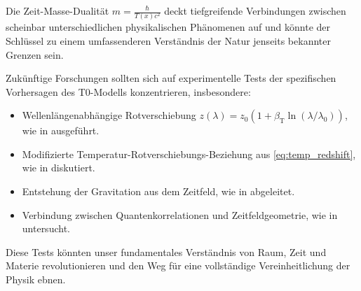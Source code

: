 \documentclass[12pt,a4paper]{article}
\newcommand{\Tfield}{T(x)}
\newcommand{\betaT}{\beta_{\text{T}}}
\begin{document}
	Die Zeit-Masse-Dualität \(m = \frac{\hbar}{\Tfield c^2}\) deckt tiefgreifende Verbindungen zwischen scheinbar unterschiedlichen physikalischen Phänomenen auf und könnte der Schlüssel zu einem umfassenderen Verständnis der Natur jenseits bekannter Grenzen sein.
	
	Zukünftige Forschungen sollten sich auf experimentelle Tests der spezifischen Vorhersagen des T0-Modells konzentrieren, insbesondere:
	
	\begin{itemize}
		\item Wellenlängenabhängige Rotverschiebung \(z(\lambda) = z_0 (1 + \betaT \ln(\lambda/\lambda_0))\), wie in \cite{pascher_messdifferenzen_2025} ausgeführt.
		\item Modifizierte Temperatur-Rotverschiebungs-Beziehung aus \cref{eq:temp_redshift}, wie in \cite{pascher_temp_2025} diskutiert.
		\item Entstehung der Gravitation aus dem Zeitfeld, wie in \cite{pascher_emergente_gravitation_2025} abgeleitet.
		\item Verbindung zwischen Quantenkorrelationen und Zeitfeldgeometrie, wie in \cite{pascher_feldtheorie_2025} untersucht.
	\end{itemize}
	
	Diese Tests könnten unser fundamentales Verständnis von Raum, Zeit und Materie revolutionieren und den Weg für eine vollständige Vereinheitlichung der Physik ebnen.
	
\end{document}
